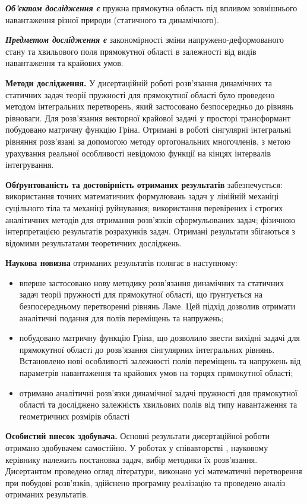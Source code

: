 \textit{\textbf{Об’єктом дослідження є}}
пружна прямокутна область під впливом зовнішнього навантаження різної природи (статичного та динамічного).

\textit{\textbf{Предметом дослідження є}}
закономірності зміни напружено-деформованого стану та хвильового поля прямокутної області в залежності від видів навантаження та крайових умов.

\textbf{Методи дослідження.}
У дисертаційній роботі розв'язання динамічних та статичних задач теорії пружності для прямокутної області було проведено методом інтегральних перетворень,
який застосовано безпосередньо до рівнянь рівноваги. 
Для розв'язання векторної крайової задачі у просторі трансформант побудовано матричну функцію Гріна.
Отримані в роботі сінгулярні інтегральні рівняння розв'язані за допомогою методу ортогональних многочленів,
з метою урахування реальної особливості невідомою функції на кінцях інтервалів інтегрування.

\textbf{Обґрунтованість та достовірність отриманих результатів} забезпечується:
використання точних математичних формулювань задач у лінійній механіці суцільного тіла та механіці руйнування;
використання перевірених і строгих аналітичних методів для отримання розв'язків сформульованих задач;
фізичною інтерпретацією результатів розрахунків задач.
Отримані результати збігаються з відомими результатами теоретичних досліджень.

\textbf{Наукова новизна} отриманих результатів полягає в наступному:
\begin{itemize}
    \item вперше застосовано нову методику розв'язання динамічних та статичних задач теорії пружності для прямокутної області,
    що ґрунтується на безпосередньому перетворенні рівнянь Ламе. Цей підхід дозволив отримати аналітичні подання для полів переміщень та напружень;
    \item побудовано матричну функцію Гріна, що дозволило звести вихідні задачі для прямокутної області до розв'язання сінгулярних інтегральних рівнянь.
    Встановлено нові особливості залежності полів переміщень та напружень від параметрів навантаження та крайових умов на торцях прямокутної області;
    \item отримано аналітичні розв'язки динамічної задачі пружності для прямокутної області та досліджено залежність хвильових полів від типу навантаження та геометричних розмірів області
\end{itemize}

\textbf{Особистий внесок здобувача.}
Основні результати дисертаційної роботи отримано здобувачем самостійно.
У роботах у співавторстві \cite{pozhylenkov_1, pozhylenkov_2, pozhylenkov_3, pozhylenkov_4, pozhylenkov_5, pozhylenkov_6},
науковому керівнику належить постановка задач, вибір методики їх розв’язання.
Дисертантом проведено огляд літератури, виконано усі математичні перетворення при побудові розв’язків,
здійснено програмну реалізацію та проведено аналіз отриманих результатів.

